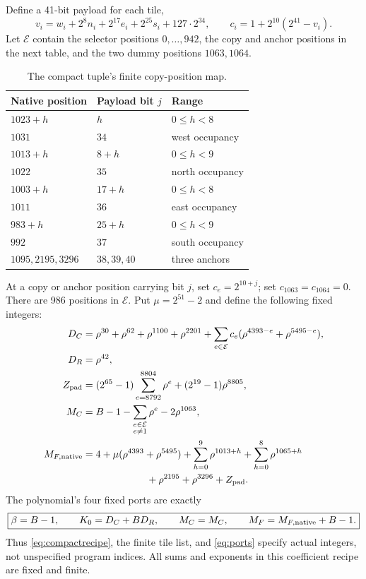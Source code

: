 \documentclass[11pt,a4paper]{article}
\theoremstyle{definition}
\newcommand{\MC}{M_C}
\newcommand{\MF}{M_F}
\begin{document}
Define a 41-bit payload for each tile,
\[
 v_i=w_i+2^8n_i+2^{17}e_i+2^{25}s_i+127\cdot2^{34},
 \qquad c_i=1+2^{10}(2^{41}-v_i).
\]
Let \(\mathcal E\) contain the selector positions \(0,\ldots,942\),
the copy and anchor positions in the next table, and the two
dummy positions \(1063,1064\).

\begin{table}[htbp]
\centering\small
\begin{tabular}{@{}lll@{}}
\toprule
Native position & Payload bit \(j\) & Range\\
\midrule
\(1023+h\)&\(h\)&\(0\le h<8\)\\
\(1031\)&\(34\)&west occupancy\\
\(1013+h\)&\(8+h\)&\(0\le h<9\)\\
\(1022\)&\(35\)&north occupancy\\
\(1003+h\)&\(17+h\)&\(0\le h<8\)\\
\(1011\)&\(36\)&east occupancy\\
\(983+h\)&\(25+h\)&\(0\le h<9\)\\
\(992\)&\(37\)&south occupancy\\
\(1095,2195,3296\)&\(38,39,40\)&three anchors\\
\bottomrule
\end{tabular}
\caption{The compact tuple's finite copy-position map.}
\end{table}

At a copy or anchor position carrying bit \(j\), set
\(c_e=2^{10+j}\); set \(c_{1063}=c_{1064}=0\).
There are 986 positions in \(\mathcal E\).
Put \(\mu=2^{51}-2\) and define the following fixed integers:
\begin{align}
 D_C={}&\rho^{30}+\rho^{62}+\rho^{1100}+\rho^{2201}
       +\sum_{e\in\mathcal E}c_e
                         (\rho^{4393-e}+\rho^{5495-e}),\notag\\
 D_R={}&\rho^{42},\notag\\
 Z_{\rm pad}={}&(2^{65}-1)\sum_{e=8792}^{8804}\rho^e
                         +(2^{19}-1)\rho^{8805},\notag\\
 \MC={}&B-1-\sum_{\substack{e\in\mathcal E\\e\ne1}}\rho^e
                                      -2\rho^{1063},\notag\\
 M_{F,\rm native}={}&4+\mu(\rho^{4393}+\rho^{5495})
        +\sum_{h=0}^{9}\rho^{1013+h}
        +\sum_{h=0}^{8}\rho^{1065+h}\notag\\
       &\hspace{18mm}+\rho^{2195}+\rho^{3296}+Z_{\rm pad}.
                                                        \label{eq:compactrecipe}
\end{align}
The polynomial's four fixed ports are exactly
\[
 \boxed{\beta=B-1,\qquad K_0=D_C+BD_R,\qquad
        \MC=\MC,\qquad \MF=M_{F,\rm native}+B-1.}
                                                        \label{eq:ports}
\]
Thus \eqref{eq:compactrecipe}, the finite tile list, and
\eqref{eq:ports} specify actual integers, not unspecified
program indices. All sums and exponents in this coefficient
recipe are fixed and finite.
\end{document}
